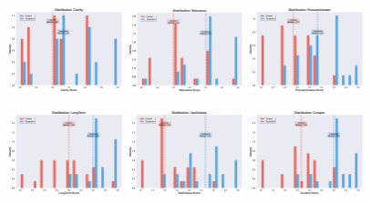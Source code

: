 \begin{figure}[t]
  \centering
  \includegraphics[width=0.3\textwidth]{plots/distribution_clarity.png} \hfill
  \includegraphics[width=0.3\textwidth]{plots/distribution_relevance.png} \hfill
  \includegraphics[width=0.3\textwidth]{plots/distribution_persuasiveness.png}

  \vspace{1em} %

  \includegraphics[width=0.3\textwidth]{plots/distribution_longterm.png} \hfill
  \includegraphics[width=0.3\textwidth]{plots/distribution_usefulness.png} \hfill
  \includegraphics[width=0.3\textwidth]{plots/distribution_context.png}


\end{figure}
